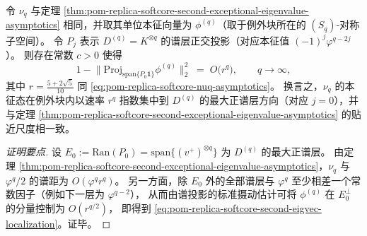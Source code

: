 \begin{theorem}[次大例外本征向量的谱层局域：向 \texorpdfstring{$j=0$}{j=0} 层的指数集中]\label{thm:pom-replica-softcore-second-exceptional-eigenvector-localization}
令 \(\nu_q\) 与定理 \ref{thm:pom-replica-softcore-second-exceptional-eigenvalue-asymptotics} 相同，并取其单位本征向量为 \(\phi^{(q)}\)（取于例外块所在的 \((S_q)\)-对称子空间）。
令 \(P_j\) 表示 \(D^{(q)}=K^{\otimes q}\) 的谱层正交投影（对应本征值 \((-1)^j\varphi^{q-2j}\)）。
则存在常数 \(c>0\) 使得
\begin{equation}\label{eq:pom-replica-softcore-second-eigvec-localization}
1-\bigl\|\mathrm{Proj}_{\mathrm{span}\{P_0\mathbf{1}\}}\phi^{(q)}\bigr\|_2^2
\;=\;
O\!\bigl(r^{q}\bigr),
\qquad q\to\infty,
\end{equation}
其中 \(r=\frac{5+2\sqrt5}{10}\) 同 \eqref{eq:pom-replica-softcore-nuq-asymptotics}。
换言之，\(\nu_q\) 的本征态在例外块内以速率 \(r^{q}\) 指数集中到 \(D^{(q)}\) 的最大正谱层方向（对应 \(j=0\)），并与定理 \ref{thm:pom-replica-softcore-second-exceptional-eigenvalue-asymptotics} 的贴近尺度相一致。
\end{theorem}
\begin{proof}[证明要点]
设 \(E_0:=\mathrm{Ran}(P_0)=\mathrm{span}\{(v^+)^{\otimes q}\}\) 为 \(D^{(q)}\) 的最大正谱层。
由定理 \ref{thm:pom-replica-softcore-second-exceptional-eigenvalue-asymptotics}，\(\nu_q\) 与 \(\varphi^q/2\) 的谱距为 \(O(\varphi^q r^{q})\)。
另一方面，除 \(E_0\) 外的全部谱层与 \(\varphi^q\) 至少相差一个常数因子（例如下一层为 \(\varphi^{q-2}\)），
从而由谱投影的标准摄动估计可将 \(\phi^{(q)}\) 在 \(E_0^\perp\) 的分量控制为 \(O(r^{q/2})\)，
即得到 \eqref{eq:pom-replica-softcore-second-eigvec-localization}。证毕。
\end{proof}

\endinput
